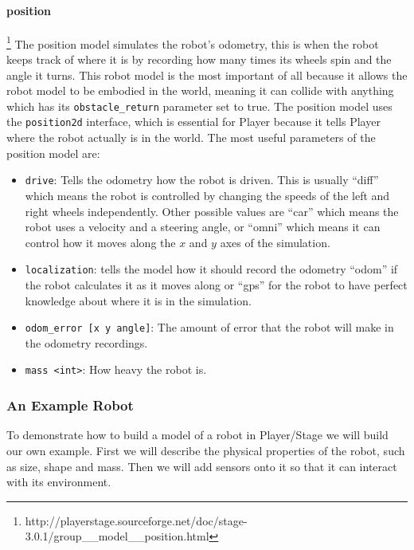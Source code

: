 \documentclass[a4paper]{article}
\newcommand{\plst}{Player/Stage\xspace}
\newcommand{\pl}{Player\xspace}
\begin{document}
\paragraph{position}\footnote{http://playerstage.sourceforge.net/doc/stage-3.0.1/group\_\_model\_\_position.html}\label{sec:position}
The position model simulates the robot's odometry, this is when the robot keeps track of where it is by recording how many times its wheels spin and the angle it turns. This robot model is the most important of all because it allows the robot model to be embodied in the world, meaning it can collide with anything which has its \verb|obstacle_return| parameter set to true. The position model uses the \verb|position2d| interface, which is essential for \pl because it tells \pl where the robot actually is in the world.
The most useful parameters of the position model are:
\begin{itemize}
\item \verb|drive|: Tells the odometry how the robot is driven. This is usually ``diff'' which means the robot is controlled by changing the speeds of the left and right wheels independently. Other possible values are ``car'' which means the robot uses a velocity and a steering angle, or ``omni'' which means it can control how it moves along the $x$ and $y$ axes of the simulation.
\item \verb|localization|: tells the model how it should record the odometry ``odom'' if the robot calculates it as it moves along or ``gps'' for the robot to have perfect knowledge about where it is in the simulation. 
\item \verb|odom_error [x y angle]|: The amount of error that the robot will make in the odometry recordings.
\item \verb|mass <int>|: How heavy the robot is.
\end{itemize}


\subsubsection{An Example Robot} \label{sec:exampleRobot}

To demonstrate how to build a model of a robot in \plst we will build our own example. First we will describe the physical properties of the robot, such as size, shape and mass. Then we will add sensors onto it so that it can interact with its environment.
\end{document}
